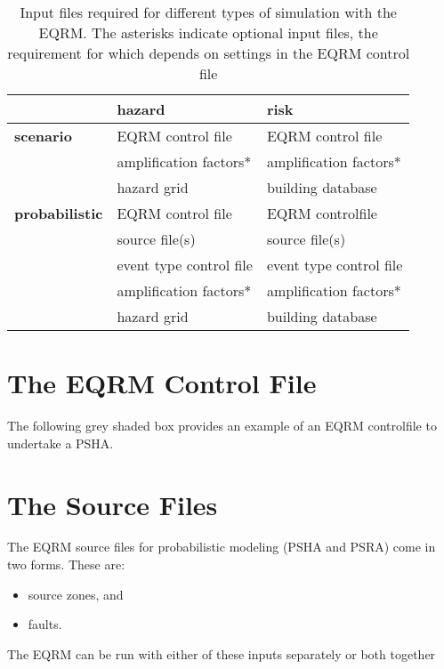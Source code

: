\begin{table}
\caption{Input files required for different types of simulation with
the EQRM. The asterisks indicate optional input files, the
requirement for which depends on settings in the EQRM control file}
\label{tab:input-overview} \centering
\begin{tabular}{|l|l|l|}
\hline
 & \textbf{hazard} & \textbf{risk} \\
\hline
\textbf{scenario} & EQRM control file & EQRM control file \\
  & amplification factors* & amplification factors* \\
  & hazard grid & building database \\
\hline
\textbf{probabilistic} & EQRM control file & EQRM controlfile\\
  & source file(s) & source file(s) \\
  & event type control file & event type control file \\
  & amplification factors* & amplification factors* \\
  & hazard grid & building database \\
\hline
\end{tabular}
\end{table}

\section{The EQRM Control File}
\label{sec:application-EQRMcf}




\clearpage The following grey shaded box provides an
example of an EQRM controlfile to undertake a PSHA.

%



\clearpage
\section{The Source Files}

The EQRM source files for probabilistic modeling (PSHA and PSRA)
come in two forms. These are:
\begin{itemize}
\item source zones, and
\item faults.
\end{itemize}
The EQRM can be run with either of these inputs separately or both
together


